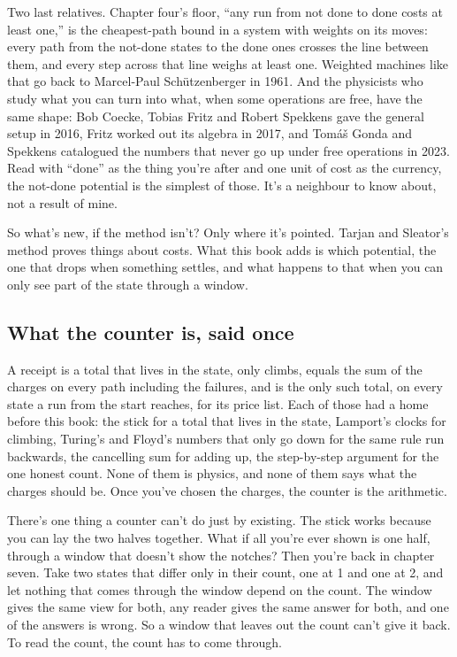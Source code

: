 \documentclass[11pt,twoside]{article}
\theoremstyle{thielethm}
\theoremstyle{thieledef}
\theoremstyle{thieledef}
\theoremstyle{thieledef}
\theoremstyle{thielethm}
\theoremstyle{thieleobs}
\theoremstyle{thielethm}
\begin{document}
Two last relatives. Chapter four's floor, ``any run from not done to done costs at least one,'' is the cheapest-path bound in a system with weights on its moves: every path from the not-done states to the done ones crosses the line between them, and every step across that line weighs at least one. Weighted machines like that go back to Marcel-Paul Schützenberger in 1961. And the physicists who study what you can turn into what, when some operations are free, have the same shape: Bob Coecke, Tobias Fritz and Robert Spekkens gave the general setup in 2016, Fritz worked out its algebra in 2017, and Tomáš Gonda and Spekkens catalogued the numbers that never go up under free operations in 2023. Read with ``done'' as the thing you're after and one unit of cost as the currency, the not-done potential is the simplest of those. It's a neighbour to know about, not a result of mine.

So what's new, if the method isn't? Only where it's pointed. Tarjan and Sleator's method proves things about costs. What this book adds is which potential, the one that drops when something settles, and what happens to that when you can only see part of the state through a window.

\subsection{What the counter is, said once}

A receipt is a total that lives in the state, only climbs, equals the sum of the charges on every path including the failures, and is the only such total, on every state a run from the start reaches, for its price list. Each of those had a home before this book: the stick for a total that lives in the state, Lamport's clocks for climbing, Turing's and Floyd's numbers that only go down for the same rule run backwards, the cancelling sum for adding up, the step-by-step argument for the one honest count. None of them is physics, and none of them says what the charges should be. Once you've chosen the charges, the counter is the arithmetic.

There's one thing a counter can't do just by existing. The stick works because you can lay the two halves together. What if all you're ever shown is one half, through a window that doesn't show the notches? Then you're back in chapter seven. Take two states that differ only in their count, one at 1 and one at 2, and let nothing that comes through the window depend on the count. The window gives the same view for both, any reader gives the same answer for both, and one of the answers is wrong. So a window that leaves out the count can't give it back. To read the count, the count has to come through.
\end{document}
